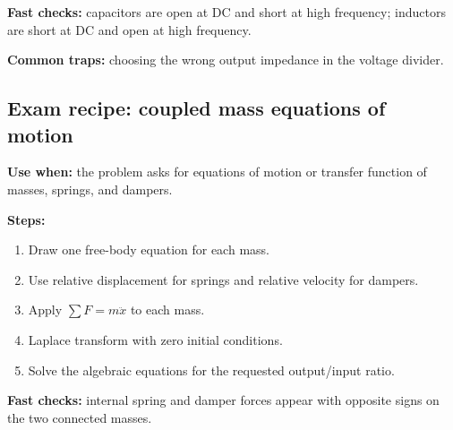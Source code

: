 \textbf{Fast checks:} capacitors are open at DC and short at high frequency; inductors are short at DC and open at high frequency.

\textbf{Common traps:} choosing the wrong output impedance in the voltage divider.

\subsection{Exam recipe: coupled mass equations of motion}

\textbf{Use when:} the problem asks for equations of motion or transfer function of masses, springs, and dampers.

\textbf{Steps:}
\begin{enumerate}
\item Draw one free-body equation for each mass.
\item Use relative displacement for springs and relative velocity for dampers.
\item Apply \(\sum F=m\ddot{x}\) to each mass.
\item Laplace transform with zero initial conditions.
\item Solve the algebraic equations for the requested output/input ratio.
\end{enumerate}

\textbf{Fast checks:} internal spring and damper forces appear with opposite signs on the two connected masses.
